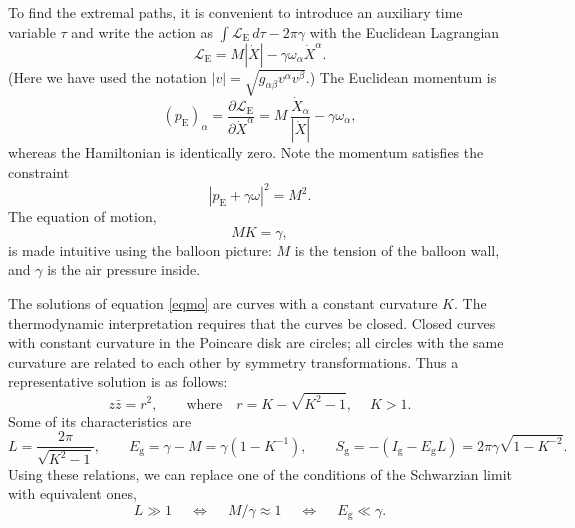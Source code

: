 \documentclass[11pt]{article}
\newcommand{\calL}{\mathcal{L}}
\newcommand{\g}{\text{g}}
\newcommand{\Euc}{\mathrm{E}}
\begin{document}
To find the extremal paths, it is convenient to introduce an auxiliary time variable $\tau$ and write the action as $\int\calL_{\Euc}\,d\tau-2\pi\gamma$ with the Euclidean Lagrangian
\begin{equation}
\calL_{\Euc}= M|\dot{X}|-\gamma\omega_{\alpha}\dot{X}^{\alpha}.
\end{equation}
(Here we have used the notation $|v|=\sqrt{g_{\alpha\beta}v^{\alpha}v^{\beta}}$.) The Euclidean momentum is
\begin{equation}
(p_{\Euc})_{\alpha}=\frac{\partial\calL_{\Euc}}{\partial\dot{X}^{\alpha}}
=M\,\frac{\dot{X}_{\alpha}}{|\dot{X}|}-\gamma\omega_{\alpha},
\end{equation}
whereas the Hamiltonian is identically zero. Note the momentum satisfies the constraint
\begin{equation}
|p_{\Euc}+\gamma\omega|^2=M^2.
\end{equation}
The equation of motion,
\begin{equation}\label{eqmo}
MK=\gamma,
\end{equation}
is made intuitive using the balloon picture: $M$ is the tension of the balloon wall, and $\gamma$ is the air pressure inside.

The solutions of equation \eqref{eqmo} are curves with a constant curvature $K$. The thermodynamic interpretation requires that the curves be closed. Closed curves with constant curvature in the Poincare disk are circles; all circles with the same curvature are related to each other by symmetry transformations. Thus a representative solution is as follows:
\begin{equation}\label{std_circle}
z\bar{z}=r^2,\qquad\text{where}\quad
r=K-\sqrt{K^2-1},\quad\: K>1.
\end{equation}
Some of its characteristics are
\begin{equation}
L=\frac{2\pi}{\sqrt{K^2-1}},\qquad E_{\g}=\gamma-M=\gamma(1-K^{-1}),\qquad
S_{\g}=-(I_{\g}-E_{\g}L)=2\pi\gamma\sqrt{1-K^{-2}}.
\end{equation}
Using these relations, we can replace one of the conditions of the Schwarzian limit with equivalent ones,
\begin{equation} \label{Schlim2}
L\gg 1 \quad\:\Leftrightarrow\quad\:
M/\gamma\approx 1 \quad\:\Leftrightarrow\quad\:
E_{\g}\ll\gamma.
\end{equation}
\end{document}
